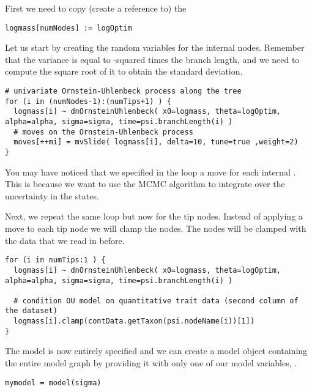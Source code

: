 First we need to copy (create a reference to) the 
{\tt \small \begin{snugshade*}
\begin{lstlisting}
logmass[numNodes] := logOptim
\end{lstlisting}
\end{snugshade*}}
Let us start by creating the random variables for the internal nodes. Remember that the variance is equal to -squared times the branch length, and we need to compute the square root of it to obtain the standard deviation.
{\tt \small \begin{snugshade*}
\begin{lstlisting}
# univariate Ornstein-Uhlenbeck process along the tree
for (i in (numNodes-1):(numTips+1) ) {
  logmass[i] ~ dnOrnsteinUhlenbeck( x0=logmass, theta=logOptim, alpha=alpha, sigma=sigma, time=psi.branchLength(i) )
  # moves on the Ornstein-Uhlenbeck process
  moves[++mi] = mvSlide( logmass[i], delta=10, tune=true ,weight=2) 
}
\end{lstlisting}
\end{snugshade*}}
You may have noticed that we specified in the loop a move for each internal . This is because we want to use the MCMC algorithm to integrate over the uncertainty in the states.

Next, we repeat the same loop but now for the tip nodes. Instead of applying a move to each tip node we will clamp the nodes. The nodes will be clamped with the data that we read in before.
{\tt \small \begin{snugshade*}
\begin{lstlisting}
for (i in numTips:1 ) {
  logmass[i] ~ dnOrnsteinUhlenbeck( x0=logmass, theta=logOptim, alpha=alpha, sigma=sigma, time=psi.branchLength(i) )

  # condition OU model on quantitative trait data (second column of the dataset)
  logmass[i].clamp(contData.getTaxon(psi.nodeName(i))[1])
}
\end{lstlisting}
\end{snugshade*}}

The model is now entirely specified and we can create a model object containing the entire model graph by providing it with only one of our model variables, \EG {}. 
{\tt \small \begin{snugshade*}
\begin{lstlisting}
mymodel = model(sigma)
\end{lstlisting}
\end{snugshade*}}

